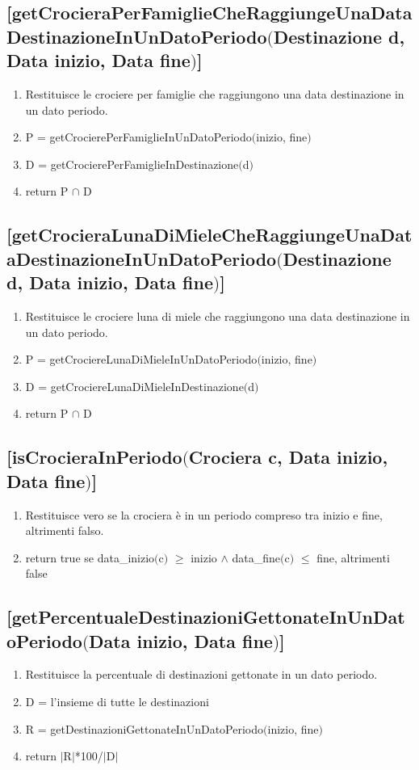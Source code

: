 \documentclass{article}
\begin{document}
\subsection*{[getCrocieraPerFamiglieCheRaggiungeUnaDataDestinazioneInUnDatoPeriodo$($Destinazione d, Data inizio, Data fine$)$]}
\begin{enumerate}
    \item Restituisce le crociere per famiglie che raggiungono una data destinazione in un dato periodo.
    \item P = getCrocierePerFamiglieInUnDatoPeriodo$($inizio, fine$)$
    \item D = getCrocierePerFamiglieInDestinazione$($d$)$
    \item return P $\cap$ D
\end{enumerate}

\subsection*{[getCrocieraLunaDiMieleCheRaggiungeUnaDataDestinazioneInUnDatoPeriodo$($Destinazione d, Data inizio, Data fine$)$]}
\begin{enumerate}
    \item Restituisce le crociere luna di miele che raggiungono una data destinazione in un dato periodo.
    \item P = getCrociereLunaDiMieleInUnDatoPeriodo$($inizio, fine$)$
    \item D = getCrociereLunaDiMieleInDestinazione$($d$)$
    \item return P $\cap$ D
\end{enumerate}

\subsection*{[isCrocieraInPeriodo$($Crociera c, Data inizio, Data fine$)$]}
\begin{enumerate}
    \item Restituisce vero se la crociera è in un periodo compreso tra inizio e fine, altrimenti falso.
    \item return true se data\_inizio$($c$)$ $\geq$ inizio $\land$ data\_fine$($c$)$ $\leq$ fine, altrimenti false
\end{enumerate}

\subsection*{[getPercentualeDestinazioniGettonateInUnDatoPeriodo$($Data inizio, Data fine$)$]}
\begin{enumerate}
    \item Restituisce la percentuale di destinazioni gettonate in un dato periodo.
    \item D = l'insieme di tutte le destinazioni
    \item R = getDestinazioniGettonateInUnDatoPeriodo$($inizio, fine$)$
    \item return $|$R$|$*100/$|$D$|$
\end{enumerate}
\end{document}
